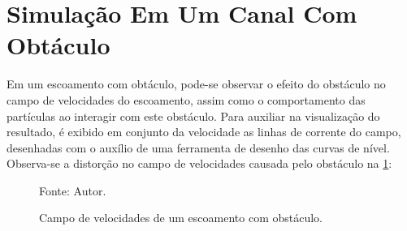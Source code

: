 \section{\textbf{Simulação Em Um Canal Com Obtáculo}}
\label{sec_obstacle}
Em um escoamento com obtáculo, pode-se observar o efeito do obstáculo no campo de velocidades do escoamento, assim como o comportamento das partículas ao interagir com este obstáculo.
Para auxiliar na visualização do resultado, é exibido em conjunto da velocidade as linhas de corrente do campo, desenhadas com o auxílio de uma ferramenta de desenho das curvas de nível.
Observa-se a distorção no campo de velocidades causada pelo obstáculo na \ref{obstacle_result}:
\begin{figure}[H]
    \centering
     {\raggedleft \scriptsize Fonte: Autor.}
    \caption{Campo de velocidades de um escoamento com obstáculo.}
    \label{obstacle_result}
\end{figure}


